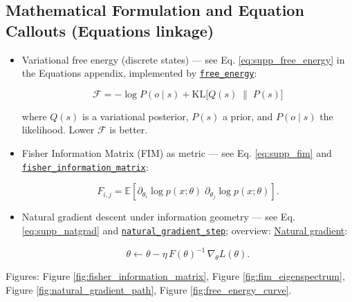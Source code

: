 \documentclass[
  10pt,
]{article}
\begin{document}
\hypertarget{mathematical-formulation-and-equation-callouts-equations-linkage}{%
\subsection{Mathematical Formulation and Equation Callouts (Equations
linkage)}\label{mathematical-formulation-and-equation-callouts-equations-linkage}}

\begin{itemize}
\item
  Variational free energy (discrete states) --- see Eq.
  \eqref{eq:supp_free_energy} in the Equations appendix, implemented by
  \href{08_equations_appendix.md\#code:free_energy}{\texttt{free\_energy}}:

  \begin{equation}\label{eq:free_energy_appendix_ref}
  \mathcal{F} = -\log P(o\mid s) + \mathrm{KL}\big[ Q(s)\;\|\; P(s) \big]
  \end{equation}

  where \(Q(s)\) is a variational posterior, \(P(s)\) a prior, and
  \(P(o\mid s)\) the likelihood. Lower \(\mathcal{F}\) is better.
\item
  Fisher Information Matrix (FIM) as metric --- see Eq.
  \eqref{eq:supp_fim} and
  \href{08_equations_appendix.md\#code:fisher_information_matrix}{\texttt{fisher\_information\_matrix}}:

  \begin{equation}\label{eq:fim_definition}
  F_{i,j} = \mathbb{E}\left[ \partial_{\theta_i} \log p(x;\theta)\; \partial_{\theta_j} \log p(x;\theta) \right].
  \end{equation}
\item
  Natural gradient descent under information geometry --- see Eq.
  \eqref{eq:supp_natgrad} and
  \href{08_equations_appendix.md\#code:natural_gradient_step}{\texttt{natural\_gradient\_step}};
  overview:
  \href{https://en.wikipedia.org/wiki/Natural_gradient}{Natural
  gradient}:

  \begin{equation}\label{eq:natural_gradient_update}
  \theta \leftarrow \theta - \eta\, F(\theta)^{-1}\, \nabla_{\theta} L(\theta).
  \end{equation}
\end{itemize}

Figures: Figure \ref{fig:fisher_information_matrix}, Figure
\ref{fig:fim_eigenspectrum}, Figure \ref{fig:natural_gradient_path},
Figure \ref{fig:free_energy_curve}.
\end{document}
